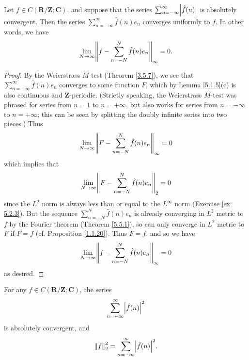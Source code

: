 \begin{theorem}\label{5.3.3}
    Let \(f \in C(\mathbf{R} / \mathbf{Z} ; \mathbf{C})\), and suppose that the series \(\sum_{n = -\infty}^\infty \abs*{\hat{f}(n)}\) is absolutely convergent.
    Then the series \(\sum_{n = -\infty}^\infty \hat{f}(n) e_n\) converges uniformly to \(f\).
    In other words, we have
    \[
        \lim_{N \to \infty} \norm*{f - \sum_{n = -N}^N \hat{f}(n) e_n}_{\infty} = 0.
    \]
\end{theorem}

\begin{proof}
    By the Weierstrass \(M\)-test (Theorem \ref{3.5.7}), we see that \(\sum_{n = -\infty}^\infty \hat{f}(n) e_n\) converges to some function \(F\), which by Lemma \ref{5.1.5}(c) is also continuous and \(\mathbf{Z}\)-periodic.
    (Strictly speaking, the Weierstrass \(M\)-test was phrased for series from \(n = 1\) to \(n = +\infty\), but also works for series from \(n = -\infty\) to \(n = +\infty\);
    this can be seen by splitting the doubly infinite series into two pieces.)
    Thus
    \[
        \lim_{N \to \infty} \norm*{F - \sum_{n = -N}^N \hat{f}(n) e_n}_{\infty} = 0
    \]
    which implies that
    \[
        \lim_{N \to \infty} \norm*{F - \sum_{n = -N}^N \hat{f}(n) e_n}_2 = 0
    \]
    since the \(L^2\) norm is always less than or equal to the \(L^\infty\) norm (Exercise \ref{ex 5.2.3}).
    But the sequence \(\sum_{n = -N}^N \hat{f}(n) e_n\) is already converging in \(L^2\) metric to \(f\) by the Fourier theorem (Theorem \ref{5.5.1}), so can only converge in \(L^2\) metric to \(F\) if \(F = f\)
    (cf. Proposition \ref{1.1.20}).
    Thus \(F = f\), and so we have
    \[
        \lim_{N \to \infty} \norm*{f - \sum_{n = -N}^N \hat{f}(n) e_n}_{\infty} = 0
    \]
    as desired.
\end{proof}

\begin{theorem}\label{5.5.4}
    For any \(f \in C(\mathbf{R} / \mathbf{Z} ; \mathbf{C})\), the series
    \[
        \sum_{n = -\infty}^\infty \abs*{\hat{f}(n)}^2
    \]
    is absolutely convergent, and
    \[
        \norm*{f}_2^2 = \sum_{n = -\infty}^\infty \abs*{\hat{f}(n)}^2.
    \]
\end{theorem}

